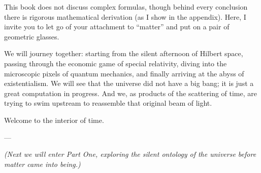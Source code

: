 This book does not discuss complex formulas, though behind every conclusion there is rigorous mathematical derivation (as I show in the appendix). Here, I invite you to let go of your attachment to ``matter'' and put on a pair of geometric glasses.

We will journey together: starting from the silent afternoon of Hilbert space, passing through the economic game of special relativity, diving into the microscopic pixels of quantum mechanics, and finally arriving at the abyss of existentialism. We will see that the universe did not have a big bang; it is just a great computation in progress. And we, as products of the scattering of time, are trying to swim upstream to reassemble that original beam of light.

Welcome to the interior of time.

---

\textit{(Next we will enter Part One, exploring the silent ontology of the universe before matter came into being.)}

